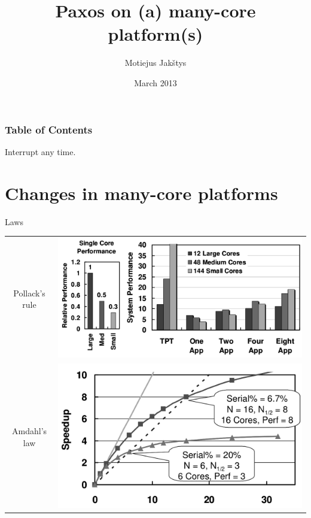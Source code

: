 \documentclass{beamer}
\title{Paxos on (a) many-core platform(s)}
\author{Motiejus Jak\v{s}tys}
\date{March 2013}
\begin{document}
\begin{frame}[plain]
    \titlepage
\end{frame}

\begin{frame}
    \frametitle{Table of Contents}
    \tableofcontents[currentsection]
    Interrupt any time.
\end{frame}

\section{Changes in many-core platforms}

\begin{frame}{Laws}
    \begin{tabular}{cm{0cm}}
            Pollack's rule &
            \pause
            \includegraphics[height=0.4\textheight]{images/pollack.png}
            \\
            Amdahl's law &
            \pause
            \includegraphics[height=0.4\textheight]{images/amdahl.png} \\
    \end{tabular}
\end{frame}
\end{document}
